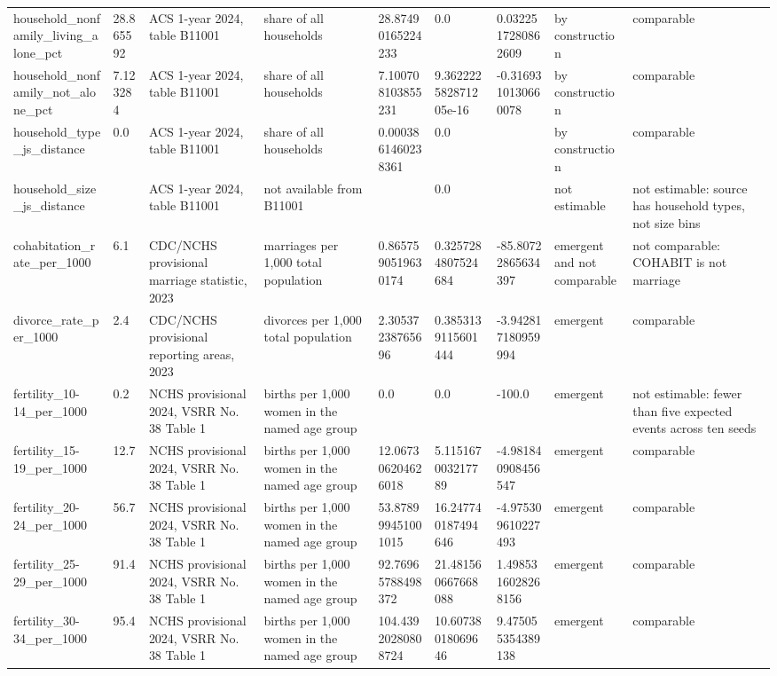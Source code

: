 \begin{longtable}{lllllllll}
household\_nonfamily\_living\_alone\_pct & 28.865592 & ACS 1-year 2024, table B11001 & share of all households & 28.87490165224233 & 0.0 & 0.0322517280862609 & by construction & comparable \\
household\_nonfamily\_not\_alone\_pct & 7.123284 & ACS 1-year 2024, table B11001 & share of all households & 7.100708103855231 & 9.362222582871205e-16 & -0.3169310130660078 & by construction & comparable \\
household\_type\_js\_distance & 0.0 & ACS 1-year 2024, table B11001 & share of all households & 0.0003861460238361 & 0.0 &  & by construction & comparable \\
household\_size\_js\_distance &  & ACS 1-year 2024, table B11001 & not available from B11001 &  & 0.0 &  & not estimable & not estimable: source has household types, not size bins \\
cohabitation\_rate\_per\_1000 & 6.1 & CDC/NCHS provisional marriage statistic, 2023 & marriages per 1,000 total population & 0.8657590519630174 & 0.3257284807524684 & -85.80722865634397 & emergent and not comparable & not comparable: COHABIT is not marriage \\
divorce\_rate\_per\_1000 & 2.4 & CDC/NCHS provisional reporting areas, 2023 & divorces per 1,000 total population & 2.30537238765696 & 0.3853139115601444 & -3.942817180959994 & emergent & comparable \\
fertility\_10-14\_per\_1000 & 0.2 & NCHS provisional 2024, VSRR No. 38 Table 1 & births per 1,000 women in the named age group & 0.0 & 0.0 & -100.0 & emergent & not estimable: fewer than five expected events across ten seeds \\
fertility\_15-19\_per\_1000 & 12.7 & NCHS provisional 2024, VSRR No. 38 Table 1 & births per 1,000 women in the named age group & 12.067306204626018 & 5.115167003217789 & -4.981840908456547 & emergent & comparable \\
fertility\_20-24\_per\_1000 & 56.7 & NCHS provisional 2024, VSRR No. 38 Table 1 & births per 1,000 women in the named age group & 53.878999451001015 & 16.247740187494646 & -4.975309610227493 & emergent & comparable \\
fertility\_25-29\_per\_1000 & 91.4 & NCHS provisional 2024, VSRR No. 38 Table 1 & births per 1,000 women in the named age group & 92.76965788498372 & 21.481560667668088 & 1.4985316028268156 & emergent & comparable \\
fertility\_30-34\_per\_1000 & 95.4 & NCHS provisional 2024, VSRR No. 38 Table 1 & births per 1,000 women in the named age group & 104.43920280808724 & 10.60738018069646 & 9.475055354389138 & emergent & comparable \\

\end{longtable}
